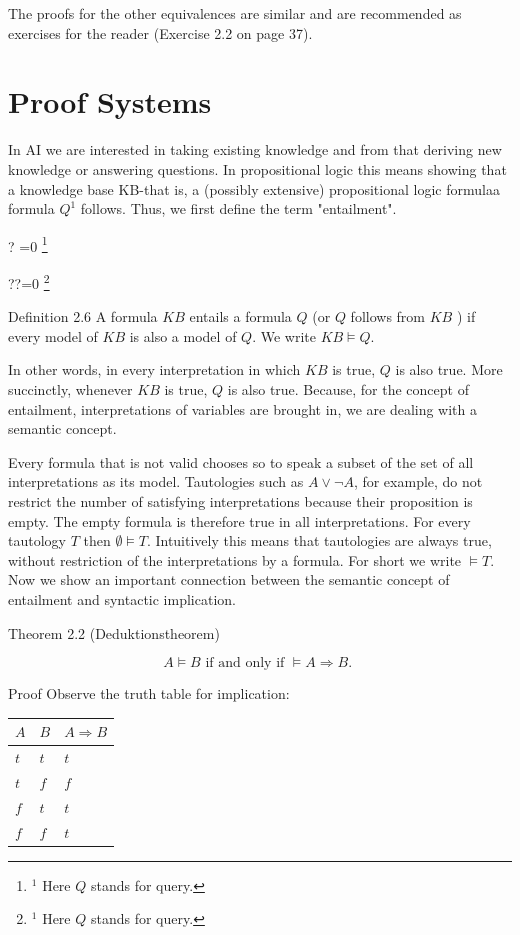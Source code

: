 \documentclass[10pt]{book}
\let\svthefootnote\thefootnote
\newcommand\blfootnotetext[1]{%
  \let\thefootnote\relax\footnote{#1}%
  \addtocounter{footnote}{-1}%
  \let\thefootnote\svthefootnote%
}
\let\svfootnotetext\footnotetext
\renewcommand\footnotetext[2][?]{%
  \if\relax#1\relax%
    \ifnum\value{footnote}=0\blfootnotetext{#2}\else\svfootnotetext{#2}\fi%
  \else%
    \if?#1\ifnum\value{footnote}=0\blfootnotetext{#2}\else\svfootnotetext{#2}\fi%
    \else\svfootnotetext[#1]{#2}\fi%
  \fi
}
\begin{document}
The proofs for the other equivalences are similar and are recommended as exercises for the reader (Exercise 2.2 on page 37).

\section{Proof Systems}
In AI we are interested in taking existing knowledge and from that deriving new knowledge or answering questions. In propositional logic this means showing that a knowledge base KB-that is, a (possibly extensive) propositional logic formulaa formula $Q^{1}$ follows. Thus, we first define the term "entailment".

Definition 2.6 A formula $K B$ entails a formula $Q$ (or $Q$ follows from $K B$ ) if every model of $K B$ is also a model of $Q$. We write $K B \models Q$.

In other words, in every interpretation in which $K B$ is true, $Q$ is also true. More succinctly, whenever $K B$ is true, $Q$ is also true. Because, for the concept of entailment, interpretations of variables are brought in, we are dealing with a semantic concept.

Every formula that is not valid chooses so to speak a subset of the set of all interpretations as its model. Tautologies such as $A \vee \neg A$, for example, do not restrict the number of satisfying interpretations because their proposition is empty. The empty formula is therefore true in all interpretations. For every tautology $T$ then $\emptyset \models T$. Intuitively this means that tautologies are always true, without restriction of the interpretations by a formula. For short we write $\models T$. Now we show an important connection between the semantic concept of entailment and syntactic implication.

Theorem 2.2 (Deduktionstheorem)

$$
A \models B \text { if and only if } \models A \Rightarrow B \text {. }
$$

Proof Observe the truth table for implication:

\begin{center}
\begin{tabular}{lll}
\hline
$A$ & $B$ & $A \Rightarrow B$ \\
\hline
$t$ & $t$ & $t$ \\
\hline
$t$ & $f$ & $f$ \\
\hline
$f$ & $t$ & $t$ \\
\hline
$f$ & $f$ & $t$ \\
\hline
\end{tabular}
\end{center}
\end{document}
